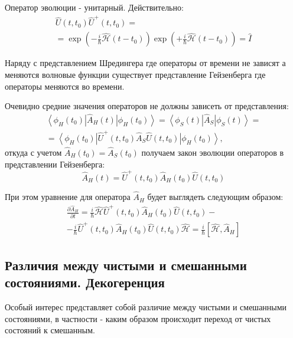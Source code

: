 Оператор эволюции - унитарный. Действительно:
\begin{eqnarray}
\hat{U}\left(t,t_0\right)\hat{U}^+\left(t,t_0\right) = 
\nonumber \\
= \exp\left( -\frac{i}{\hbar} \hat{\mathcal{H}} \left( t - t_0 \right)
\right)
\exp\left( +\frac{i}{\hbar} \hat{\mathcal{H}} \left( t - t_0 \right)
\right)
= \hat{I}
\nonumber
\end{eqnarray}

Наряду с представлением Шредингера где операторы от времени не зависят
а меняются волновые функции существует представление Гейзенберга где
операторы меняются во времени.

Очевидно средние значения операторов не должны зависеть от
представления:
\begin{eqnarray}
\left< \phi_H\left(t_0\right) \right|\hat{A}_H\left(t\right)\left| 
\phi_H\left(t_0\right) \right> = 
\left< \phi_S\left(t\right) \right|\hat{A}_S\left| 
\phi_S\left(t\right) \right> = 
\nonumber \\
=
\left<
\phi_H\left(t_0\right)\right|\hat{U}^+\left(t,t_0\right)\hat{A}_S\hat{U}\left(t,t_0\right)\left|
\phi_H\left(t_0\right) \right>,
\nonumber
\end{eqnarray}
откуда с учетом $\hat{A}_H\left(t_0\right) = \hat{A}_S\left(t_0\right)$ получаем закон эволюции операторов в представлении Гейзенберга:
\begin{equation}
\hat{A}_H\left(t\right) = \hat{U}^+\left(t,t_0\right)\hat{A}_H\left(t_0\right)\hat{U}\left(t,t_0\right)
\label{eqAddWaveFunc_HeizenbergU}
\end{equation}

При этом уравнение для оператора $\hat{A}_H$ будет выглядеть следующим
образом:
\begin{eqnarray}
  \frac{\partial \hat{A}_H}{\partial t} =
  \frac{i}{\hbar} \hat{\mathcal{H}}
  \hat{U}^+\left(t,t_0\right)\hat{A}_H\left(t_0\right)\hat{U}\left(t,t_0\right)
  -
  \nonumber \\
  - \frac{i}{\hbar}
  \hat{U}^+\left(t,t_0\right)\hat{A}_H\left(t_0\right)\hat{U}\left(t,t_0\right)
  \hat{\mathcal{H}} =
  \frac{i}{\hbar} \left[\hat{\mathcal{H}}, \hat{A}_H \right]
  \label{eqAddWaveFunc_HeizenbergT}
\end{eqnarray}

\subsection{Различия между чистыми и смешанными
  состояниями. Декогеренция}
Особый интерес представляет собой различие между чистыми и смешанными
состояниями, в частности - каким образом происходит переход от чистых
состояний к смешанным.

